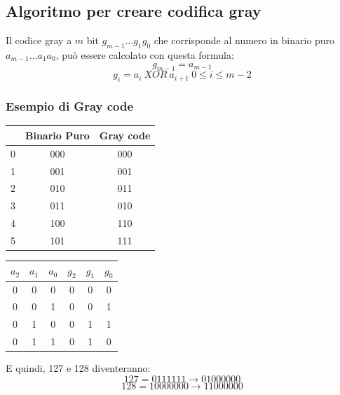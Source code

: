 \documentclass{report}
\begin{document}
	\newpage
	
	\subsection{Algoritmo per creare codifica gray}
	Il codice gray a $m$ bit $g_{m-1}...g_1g_0$ che corrisponde al numero in binario puro $a_{m-1}...a_1a_0$, può essere calcolato con questa formula:
	$$
	g_{m-1} = a_{m-1}
	$$
	$$
	g_i = a_i \ XOR \ a_{i+1} \ 0 \leq i \leq m-2
	$$
	
	\subsubsection{Esempio di Gray code}
	\begin{center}
		\begin{tabular}{| c || c | c |} 
			\hline
			  & Binario Puro & Gray code \\
			\hline 
			\hline
			0 & 000          & 000       \\
			\hline
			1 & 001          & 001       \\
			\hline
			2 & 010          & 011       \\
			\hline
			3 & 011          & 010       \\
			\hline
			4 & 100          & 110       \\
			\hline
			5 & 101          & 111       \\
			\hline
		\end{tabular}
	\end{center}
	
	\begin{center}
		\begin{tabular}{| c | | c | c | | c | c | c |} 
			
			\hline
			$a_2$ & $a_1$ & $a_0$ & $g_2$ & $g_1$ & $g_0$ \\
			\hline 
			0     & 0     & 0     & 0     & 0     & 0     \\
			\hline
			0     & 0     & 1     & 0     & 0     & 1     \\
			\hline
			0     & 1     & 0     & 0     & 1     & 1     \\
			\hline
			0     & 1     & 1     & 0     & 1     & 0     \\
			\hline
		\end{tabular}
	\end{center}
	E quindi, 127 e 128 diventeranno:
	$$
	127 = 0111111 \rightarrow 01000000
	$$
	$$
	128 = 10000000 \rightarrow 11000000
	$$
	
\end{document}
